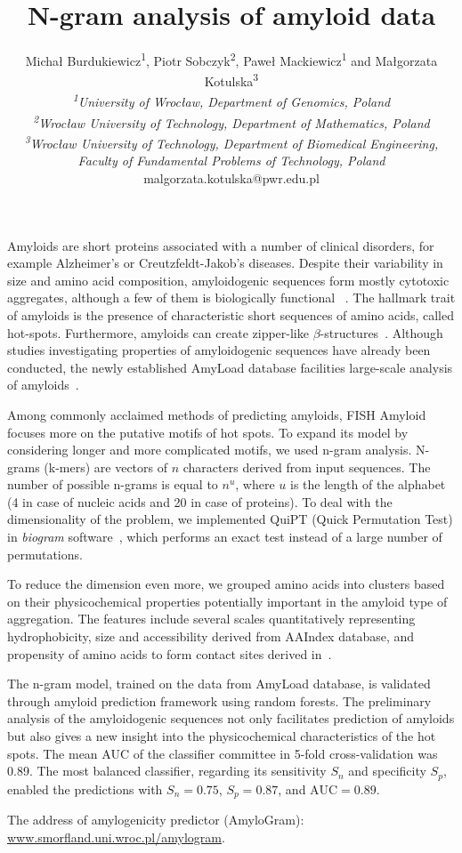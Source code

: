 \documentclass[english]{gcb15abstract}
\title{N-gram analysis of amyloid data}
\author{
Micha\l{} Burdukiewicz\textsuperscript{1}, Piotr Sobczyk\textsuperscript{2}, Pawe\l{} Mackiewicz\textsuperscript{1} and Ma\l{}gorzata Kotulska\textsuperscript{3} \\
\small{
{\normalfont\itshape \textsuperscript{1}University of Wroc\l{}aw, Department of Genomics, Poland}\\
{\normalfont\itshape \textsuperscript{2}Wroc\l{}aw University of Technology, Department of Mathematics, Poland}\\
{\normalfont\itshape \textsuperscript{3}Wroc\l{}aw University of Technology, Department of Biomedical Engineering, Faculty of Fundamental Problems of Technology, Poland}\\
malgorzata.kotulska@pwr.edu.pl
}
}
\begin{document}
\maketitle 

Amyloids are short proteins associated with a number of clinical disorders, for example Alzheimer's or Creutzfeldt-Jakob's diseases. Despite their variability in size and amino acid composition, amyloidogenic sequences form mostly cytotoxic aggregates, although a few of them is biologically functional ~\cite{breydo_structural_2015}. The hallmark trait of amyloids is the presence of characteristic short sequences of amino acids, called hot-spots. Furthermore, amyloids can create zipper\mbox{-}\nobreak\hspace{0pt}like $\beta$\mbox{-}\nobreak\hspace{0pt}structures~\cite{fandrich_oligomeric_2012}. Although studies investigating properties of amyloidogenic sequences have already been conducted, the newly established AmyLoad database facilities large-scale analysis of amyloids~\cite{wozniak_amyload:_2015}.

Among commonly acclaimed methods of predicting amyloids, FISH Amyloid~\cite{gasior_fish_2014} focuses more on the putative motifs of hot spots. To expand its model by considering longer and more complicated motifs, we used n-gram analysis. N-grams (k-mers) are vectors of $n$ characters derived from input sequences. The number of possible n-grams is equal to $n^u$, where $u$ is the length of the alphabet (4 in case of nucleic acids and 20 in case of proteins). To deal with the dimensionality of the problem, we implemented QuiPT (Quick Permutation Test) in \textit{biogram} software~\cite{burdukiewicz_biogram:_2015}, which performs an exact test instead of a large number of permutations. 

To reduce the dimension even more, we grouped amino acids into clusters based on their physicochemical properties potentially important in the amyloid type of aggregation. The features include several scales quantitatively representing hydrophobicity, size and accessibility derived from AAIndex database, and propensity of amino acids to form contact sites derived in~\cite{wozniak_characteristics_2014}.

The n-gram model, trained on the data from AmyLoad database, is validated through amyloid prediction framework using random forests. The preliminary analysis of the amyloidogenic sequences not only facilitates prediction of amyloids but also gives a new insight into the physicochemical characteristics of the hot spots. The mean AUC of the classifier committee in 5-fold cross-validation was 0.89. The most balanced classifier, regarding its sensitivity $S_n$ and specificity $S_p$, enabled the predictions with $S_n=0.75$, $S_p=0.87$, and $\textrm{AUC}=0.89$. 

The address of amylogenicity predictor (AmyloGram):  
\url{www.smorfland.uni.wroc.pl/amylogram}.

\scriptsize{

}
\end{document}
